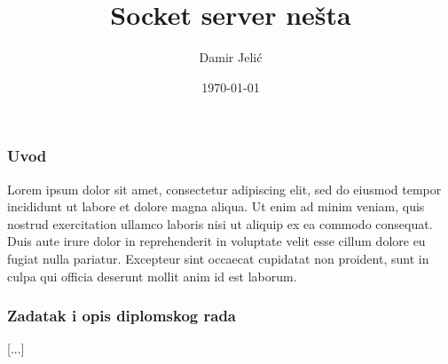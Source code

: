 \documentclass{beamer}
\title{Socket server nešta}
\subtitle{}
\date{\today}
\author{Damir Jelić}
\institute{Elektrotehnički fakultet Osijek \\ Diplomski studij računarstva}
\begin{document}
\maketitle

\begin{frame}[fragile]
\frametitle{Uvod}
Lorem ipsum dolor sit amet, consectetur adipiscing elit, sed do eiusmod tempor
incididunt ut labore et dolore magna aliqua. Ut enim ad minim veniam, quis
nostrud exercitation ullamco laboris nisi ut aliquip ex ea commodo consequat.
Duis aute irure dolor in reprehenderit in voluptate velit esse cillum dolore eu
fugiat nulla pariatur. Excepteur sint occaecat cupidatat non proident, sunt in
culpa qui officia deserunt mollit anim id est laborum.

\end{frame}

\begin{frame}[fragile]
    \frametitle{Zadatak i opis diplomskog rada}
    [...]
\end{frame}


\end{document}
